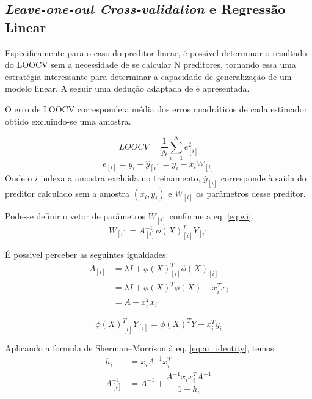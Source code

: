 \subsection{ \textit{Leave-one-out Cross-validation} e Regressão Linear}

Especificamente para o caso do preditor linear, é possível determinar o resultado do LOOCV sem a necessidade de se 
calcular N preditores, tornando essa uma estratégia interessante para determinar a capacidade de generalização de 
um modelo linear. A seguir uma dedução adaptada de \cite[p. 268]{lin_reg_analysis} é apresentada.

O erro de LOOCV corresponde a média dos erros quadráticos de cada estimador obtido excluindo-se uma amostra. 

\begin{equation}
    LOOCV = \dfrac{1}{N} \sum_{i=1}^{N}e^2_{[i]}
    \label{eq:cv_error}
\end{equation}
\begin{equation}
    e_{[i]} = y_i - \hat{y}_{[i]} = y_i - x_iW_{[i]} 
    \label{eq:ith_error}
\end{equation}
Onde o $i$ indexa a amostra excluída no treinamento, $\hat{y}_{[i]}$ corresponde à saída do preditor calculado sem a
amostra $(x_i,y_i)$ e $W_{[i]}$ os parâmetros desse preditor.

Pode-se definir o vetor de parâmetros $W_{[i]}$ conforme a eq. \ref{eq:wi}.
\begin{equation}
    W_{[i]} = A_{[i]}^{-1}\phi(X)_{[i]}^TY_{[i]}
    \label{eq:wi}
\end{equation} 

É possivel perceber as seguintes igualdades:
\smallskip\noindent
\begin{equation}
    \begin{split}
        A_{[i]} &= \lambda I + \phi(X)_{[i]}^T\phi(X)_{[i]} \\
                &= \lambda I + \phi(X)^T\phi(X) - x_i^Tx_i \\
                &= A - x_i^Tx_i    
    \end{split}
    \label{eq:ai_identity}
\end{equation} 

\begin{equation}
    \phi(X)_{[i]}^TY_{[i]} = \phi(X)^TY - x_i^Ty_i
    \label{eq:X_iY_i_identity}
\end{equation} 

Aplicando a formula de Sherman–Morrison à eq. \ref{eq:ai_identity}, temos:
\smallskip\noindent
\begin{equation}
    \begin{split}        
       h_i &= x_iA^{-1}x_i^T \\
       A_{[i]}^{-1} &= A^{-1} + \dfrac{A^{-1}x_ix_i^TA^{-1}}{1-h_i}
    \end{split}
    \label{eq:sherman}
\end{equation}

